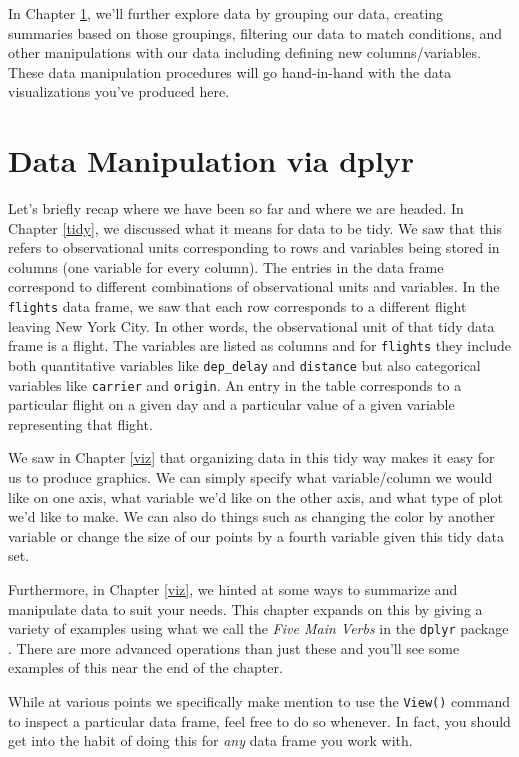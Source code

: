 \documentclass[]{tufte-book}
\begin{document}
In Chapter \ref{manip}, we'll further explore data by grouping our data,
creating summaries based on those groupings, filtering our data to match
conditions, and other manipulations with our data including defining new
columns/variables. These data manipulation procedures will go
hand-in-hand with the data visualizations you've produced here.

\chapter{Data Manipulation via dplyr}\label{manip}

Let's briefly recap where we have been so far and where we are headed.
In Chapter \ref{tidy}, we discussed what it means for data to be tidy.
We saw that this refers to observational units corresponding to rows and
variables being stored in columns (one variable for every column). The
entries in the data frame correspond to different combinations of
observational units and variables. In the \texttt{flights} data frame,
we saw that each row corresponds to a different flight leaving New York
City. In other words, the observational unit of that tidy data frame is
a flight. The variables are listed as columns and for \texttt{flights}
they include both quantitative variables like \texttt{dep\_delay} and
\texttt{distance} but also categorical variables like \texttt{carrier}
and \texttt{origin}. An entry in the table corresponds to a particular
flight on a given day and a particular value of a given variable
representing that flight.

We saw in Chapter \ref{viz} that organizing data in this tidy way makes
it easy for us to produce graphics. We can simply specify what
variable/column we would like on one axis, what variable we'd like on
the other axis, and what type of plot we'd like to make. We can also do
things such as changing the color by another variable or change the size
of our points by a fourth variable given this tidy data set.

Furthermore, in Chapter \ref{viz}, we hinted at some ways to summarize
and manipulate data to suit your needs. This chapter expands on this by
giving a variety of examples using what we call the \emph{Five Main
Verbs} in the \texttt{dplyr} package \citep{R-dplyr}. There are more
advanced operations than just these and you'll see some examples of this
near the end of the chapter.

While at various points we specifically make mention to use the
\texttt{View()} command to inspect a particular data frame, feel free to
do so whenever. In fact, you should get into the habit of doing this for
\emph{any} data frame you work with.
\end{document}
